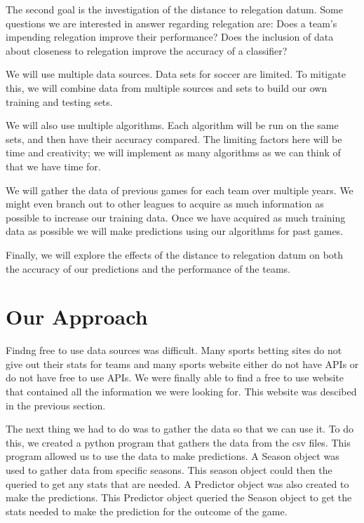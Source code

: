 \documentclass[conference]{IEEEtran}
\begin{document}
The second goal is the investigation of the distance to relegation datum. Some questions we are interested in answer regarding relegation are:
Does a team's impending relegation improve their performance?
Does the inclusion of data about closeness to relegation improve the accuracy of a classifier?

We will use multiple data sources. Data sets for soccer are limited. To mitigate this, we will combine data from multiple sources and sets to build our own training and testing sets.

We will also use multiple algorithms. Each algorithm will be run on the same sets, and then have their accuracy compared.  The limiting factors here will be time and creativity; we will implement as many algorithms as we can think of that we have time for.

We will gather the data of previous games for each team over multiple years. We might even branch out to other leagues to acquire as much information as possible to increase our training data. Once we have acquired as much training data as possible we will make predictions using our algorithms for past games.

Finally, we will explore the effects of the distance to relegation datum on both the accuracy of our predictions and the performance of the teams.
\section{Our Approach}
Findng free to use data sources was difficult. Many sports betting sites do not give out their stats for teams and many sports website either do not have APIs or do not have free to use APIs. We were finally able to find a free to use website that contained all the information we were looking for. This website was descibed in the previous section.

The next thing we had to do was to gather the data so that we can use it. To do this, we created a python program that gathers the data from the csv files. This program allowed us to use the data to make predictions. A Season object was used to gather data from specific seasons. This season object could then the queried to get any stats that are needed. A Predictor object was also created to make the predictions. This Predictor object queried the Season object to get the stats needed to make the prediction for the outcome of the game.
\end{document}
